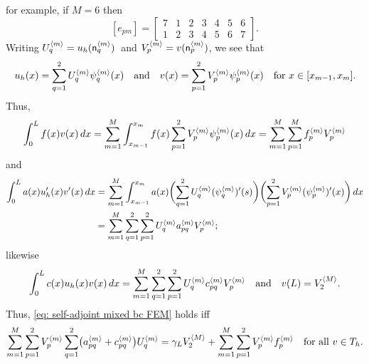for example, if $M=6$ then
\[
[e_{pm}]=\begin{bmatrix}
7&1&2&3&4&5&6\\
1&2&3&4&5&6&7\end{bmatrix}.
\]
Writing $U^{\langle m\rangle}_q=u_h(\mathsf{n}^{\langle m\rangle}_q)$~and
$V^{\langle m\rangle}_p=v(\mathsf{n}^{\langle m\rangle}_p)$, we see that
\[
u_h(x)=\sum_{q=1}^2U^{\langle m\rangle}_q\psi^{\langle m\rangle}_q(x)
\quad\text{and}\quad
v(x)=\sum_{p=1}^2V^{\langle m\rangle}_p\psi^{\langle m\rangle}_p(x)
\quad\text{for $x\in[x_{m-1},x_m]$.}
\]
Thus,
\[
\int_0^Lf(x)v(x)\,dx=\sum_{m=1}^M\int_{x_{m-1}}^{x_m}f(x)\sum_{p=1}^2
    V^{\langle m\rangle}_p\psi^{\langle m\rangle}_p(x)\,dx
    =\sum_{m=1}^M\sum_{p=1}^M f^{\langle m\rangle}_pV_p^{\langle m\rangle}
\]
and
\begin{align*}
\int_0^La(x)u_h'(x)v'(x)\,dx
    &=\sum_{m=1}^M\int_{x_{m-1}}^{x_m}a(x)
    \biggl(\sum_{q=1}^2 U^{\langle m\rangle}_q(\psi_q^{\langle m\rangle})'(s)\biggr)
    \biggl(\sum_{p=1}^2 V^{\langle m\rangle}_p(\psi_p^{\langle m\rangle})'(x)\biggr)\,dx\\
    &=\sum_{m=1}^M\sum_{q=1}^2\sum_{p=1}^2
    U^{\langle m\rangle}_qa^{\langle m\rangle}_{pq}V^{\langle m\rangle}_p;
\end{align*}
likewise
\[
\int_0^Lc(x)u_h(x)v(x)\,dx=\sum_{m=1}^M\sum_{q=1}^2\sum_{p=1}^2
    U^{\langle m\rangle}_qc^{\langle m\rangle}_{pq}V^{\langle m\rangle}_p
\quad\text{and}\quad
v(L)=V^{\langle M\rangle}_2.
\]
Thus, \eqref{eq: self-adjoint mixed bc FEM} holds iff
\[
\sum_{m=1}^M\sum_{p=1}^2V^{\langle m\rangle}_p
\sum_{q=1}^2\bigl(a^{\langle m\rangle}_{pq}+c^{\langle m\rangle}_{pq} \bigr)U^{\langle m\rangle}_q
    =\gamma_LV^{\langle M\rangle}_2+\sum_{m=1}^M\sum_{p=1}^2V^{\langle m\rangle}_pf^{\langle m\rangle}_p
    \quad\text{for all $v\in T_h$.}
\]

